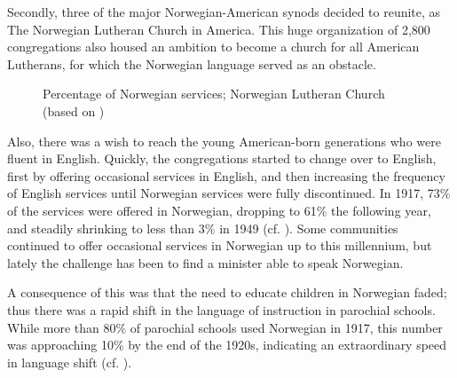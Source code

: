 \documentclass[output=paper]{langscibook}
\begin{document}
Secondly, three of the major Norwegian\hyp American synods decided to reunite, as The Norwegian Lutheran Church in America. This huge organization of 2,800 congregations also housed an ambition to become a church for all American Lutherans, for which the Norwegian language served as an obstacle. 

\begin{figure}
\caption{Percentage of Norwegian services; Norwegian Lutheran Church (based on \citealt[262--267]{Haugen1953})}
\label{tab:hjelde:6}
\end{figure}

Also, there was a wish to reach the young American\hyp born generations who were fluent in English. Quickly, the congregations started to change over to English, first by offering occasional services in English, and then increasing the frequency of English services until Norwegian services were fully discontinued. In 1917, 73\% of the services were offered in Norwegian, dropping to 61\% the following year, and steadily shrinking to less than 3\% in 1949 (cf. ). Some communities continued to offer occasional services in Norwegian up to this millennium, but lately the challenge has been to find a minister able to speak Norwegian. 

A consequence of this was that the need to educate children in Norwegian faded; thus there was a rapid shift in the language of instruction in parochial schools. While more than 80\% of parochial schools used Norwegian in 1917, this number was approaching 10\% by the end of the 1920s, indicating an extraordinary speed in language shift (cf. ). 
\end{document}
